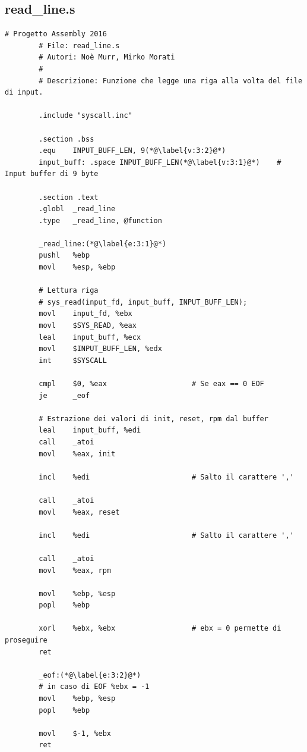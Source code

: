 \documentclass[a4paper,11pt]{article}
\begin{document}
		\subsection{read\_line.s}
		\begin{lstlisting}[language=MyAssembler, style=MyAsm]
		# Progetto Assembly 2016
		# File: read_line.s
		# Autori: Noè Murr, Mirko Morati
		#
		# Descrizione: Funzione che legge una riga alla volta del file di input.
		
		.include "syscall.inc"
		
		.section .bss
		.equ	INPUT_BUFF_LEN, 9(*@\label{v:3:2}@*)
		input_buff:	.space INPUT_BUFF_LEN(*@\label{v:3:1}@*)	# Input buffer di 9 byte
		
		.section .text
		.globl 	_read_line
		.type   _read_line, @function
		
		_read_line:(*@\label{e:3:1}@*)
		pushl	%ebp
		movl 	%esp, %ebp
		
		# Lettura riga
		# sys_read(input_fd, input_buff, INPUT_BUFF_LEN);
		movl    input_fd, %ebx
		movl    $SYS_READ, %eax
		leal    input_buff, %ecx
		movl    $INPUT_BUFF_LEN, %edx
		int     $SYSCALL
		
		cmpl    $0, %eax                    # Se eax == 0 EOF
		je      _eof
		
		# Estrazione dei valori di init, reset, rpm dal buffer
		leal    input_buff, %edi
		call    _atoi
		movl    %eax, init
		
		incl    %edi						# Salto il carattere ','
		
		call    _atoi
		movl    %eax, reset
		
		incl    %edi						# Salto il carattere ','
		
		call    _atoi
		movl    %eax, rpm
		
		movl    %ebp, %esp
		popl    %ebp
		
		xorl    %ebx, %ebx					# ebx = 0 permette di proseguire
		ret
		
		_eof:(*@\label{e:3:2}@*)
		# in caso di EOF %ebx = -1
		movl    %ebp, %esp
		popl    %ebp
		
		movl    $-1, %ebx
		ret
		\end{lstlisting}
		
		\newpage
\end{document}
